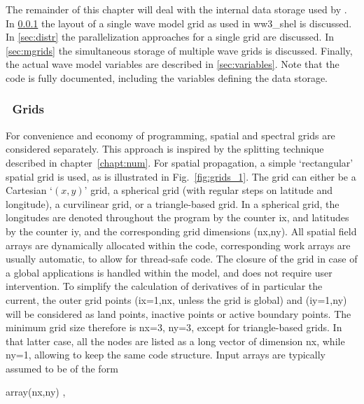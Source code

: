 The remainder of this chapter will deal with the internal data storage used by
\ws. In \para\ref{sec:grids} the layout of a single wave model grid as used in
{\file ww3\_shel} is discussed. In \para\ref{sec:distr} the parallelization
approaches for a single grid are discussed. In \para\ref{sec:mgrids} the
simultaneous storage of multiple wave grids is discussed. Finally, the actual
wave model variables are described in \para\ref{sec:variables}. Note that the
code is fully documented, including the variables defining the data storage.


\vsssub
\subsubsection{~Grids} \label{sec:grids}
\vsssub



For convenience and economy of programming, spatial and spectral grids are
considered separately. This approach is inspired by the splitting technique
described in chapter~\ref{chapt:num}. For spatial propagation, a simple
`rectangular' spatial grid is used, as is illustrated in
Fig.~\ref{fig:grids_1}. The grid can either be a Cartesian `$(x,y)$' grid, a
spherical grid (with regular steps on latitude and longitude), a curvilinear grid, 
or a triangle-based grid. In a spherical grid, the longitudes are denoted throughout the
program by the counter {\F ix}, and latitudes by the counter {\F iy}, and the
corresponding grid dimensions {\F (nx,ny)}. All spatial field arrays are
dynamically allocated within the code, corresponding work arrays are usually
automatic, to allow for thread-safe code. The closure of the grid in case of a
global applications is handled within the model, and does not require user
intervention. To simplify the calculation of derivatives of in particular the
current, the outer grid points ({\F ix=1,nx}, unless the grid is global) and
({\F iy=1,ny}) will be considered as land points, inactive points or active
boundary points. The minimum grid size therefore is {\F nx=3, ny=3}, except for 
triangle-based grids. In that latter case, all the nodes are listed as a long 
vector of dimension nx, while ny=1, allowing to keep the same code structure. Input
arrays are typically assumed to be of the form

\vspace{\baselineskip} \centerline{\F array(nx,ny) ,} \vspace{\baselineskip}

